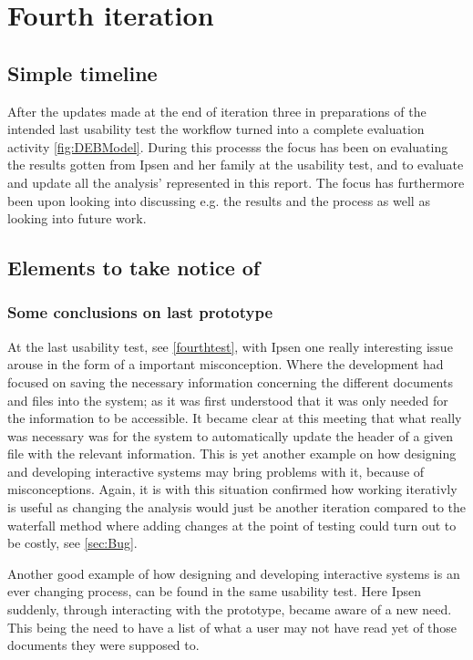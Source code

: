 \section{Fourth iteration}
\subsection{Simple timeline}\label{sec:3Iteration-timeline}
After the updates made at the end of iteration three in preparations of the intended last usability test the workflow turned into a complete evaluation activity \cref{fig:DEBModel}.
During this processs the focus has been on evaluating the results gotten from Ipsen and her family at the usability test, and to evaluate and update all the analysis' represented in this report.
The focus has furthermore been upon looking into discussing e.g. the results and the process as well as looking into future work. 

\subsection{Elements to take notice of}
\subsubsection*{Some conclusions on last prototype}
At the last usability test, see \cref{fourthtest}, with Ipsen one really interesting issue arouse in the form of a important misconception.
Where the development had focused on saving the necessary information concerning the different documents and files into the system; as it was first understood that it was only needed for the information to be accessible.
It became clear at this meeting that what really was necessary was for the system to automatically update the header of a given file  with the relevant information.
This is yet another example on how designing and developing interactive systems may bring problems with it, because of misconceptions.
Again, it is with this situation confirmed how working iterativly is useful as changing the analysis would just be another iteration compared to the waterfall method where adding changes at the point of testing could turn out to be costly, see \cref{sec:Bug}.

Another good example of how designing and developing interactive systems is an ever changing process, can be found in the same usability test.
Here Ipsen suddenly, through interacting with the prototype, became aware of a new need.
This being the need to have a list of what a user may not have read yet of those documents they were supposed to.
